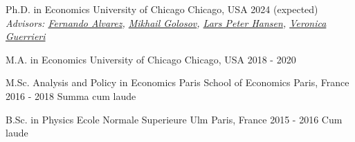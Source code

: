 

\begin{cventries}

    \cventry
    {Ph.D. in Economics} %
    {University of Chicago} %
    {Chicago, USA} %
    {2024 (expected)} %
    {\textit{Advisors: \href{https://alvarezfernando.com/}{Fernando Alvarez}, \href{https://voices.uchicago.edu/golosov/contact/}{Mikhail Golosov}, \href{https://larspeterhansen.org/contact/}{Lars Peter Hansen}, \href{https://voices.uchicago.edu/veronicaguerrieri/contact/}{Veronica Guerrieri}}}

    \cventry
    {M.A. in Economics} %
    {University of Chicago} %
    {Chicago, USA} %
    {2018 - 2020} %
    {}

    \cventry
    {M.Sc. Analysis and Policy in Economics} %
    {Paris School of Economics} %
    {Paris, France} %
    {2016 - 2018} %
    {Summa cum laude}

    \cventry
    {B.Sc. in Physics} %
    {Ecole Normale Superieure Ulm} %
    {Paris, France} %
    {2015 - 2016} %
    {Cum laude}

\end{cventries}
